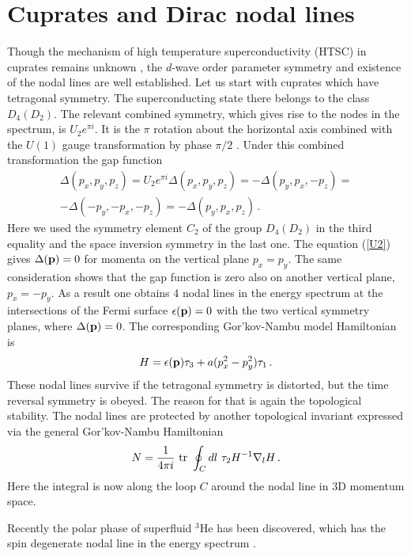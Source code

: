 \documentclass[prb,
superscriptaddress,showpacs,amsmath,amssymb]{revtex4}
\begin{document}
\section{Cuprates and Dirac nodal lines}
\label{lines}

Though the mechanism of high temperature superconductivity (HTSC) in cuprates remains
unknown \cite{Gorkov2008}, the $d$-wave order parameter symmetry and existence of the nodal lines are well established.
Let us start with cuprates which have tetragonal symmetry.  The superconducting state there belongs to the class $D_4(D_2)$.  The relevant combined symmetry, which gives rise to the nodes in the spectrum,  is $U_2e^{\pi i}$. It is the $\pi$ rotation about the horizontal axis combined with the $U(1)$ gauge transformation by phase $\pi/2$ \cite{VolovikGorkov1985}. Under this combined transformation the gap function 
\begin{eqnarray}
\Delta(p_x,p_y,p_z)=U_2e^{\pi i}\Delta(p_x,p_y,p_z)=-\Delta(p_y,p_x,-p_z)=
\nonumber
\\
-\Delta(-p_y,-p_x,-p_z)=-\Delta(p_y,p_x,p_z)\,.
\label{U2}
\end{eqnarray} 
Here we used the symmetry element $C_2$ of the group $D_4(D_2)$ in the third equality and the space inversion symmetry in the last one.
The equation (\ref{U2})  gives $\Delta({\bf p})=0$ for momenta on the vertical plane $p_x = p_y$. The same consideration shows that the gap function is zero also on another vertical plane, $p_x = -p_y$. As a result  one obtains 4 nodal lines in the energy spectrum at the intersections
of the Fermi surface $\epsilon({\bf p})=0$ with the two vertical symmetry planes, where   $\Delta({\bf p})=0$.
The corresponding Gor'kov-Nambu  model Hamiltonian is
 \begin{equation}
 H=\epsilon({\bf p})\tau_3 +  a(p_x^2 -p_y^2)\tau_1 \,.
\label{HamiltonianCuprate}
\end{equation}
These nodal lines survive if the tetragonal symmetry is distorted, but the time reversal symmetry is obeyed.
The reason for that is again the topological stability.
The nodal lines are protected by another topological invariant expressed via the general 
 Gor'kov-Nambu  Hamiltonian
  \begin{equation} 
N= {1\over 4\pi i} ~{\rm tr} ~\oint_C dl ~ \tau_2 H^{-1}\nabla_l H \,.
\label{InvariantForLine}
\end{equation}
Here the integral is now along the loop $C$ around the nodal line in 3D momentum space.

Recently the polar phase of superfluid $^3$He has been discovered, which has the spin degenerate nodal line in the energy spectrum \cite{Dmitriev2015}.
\end{document}
